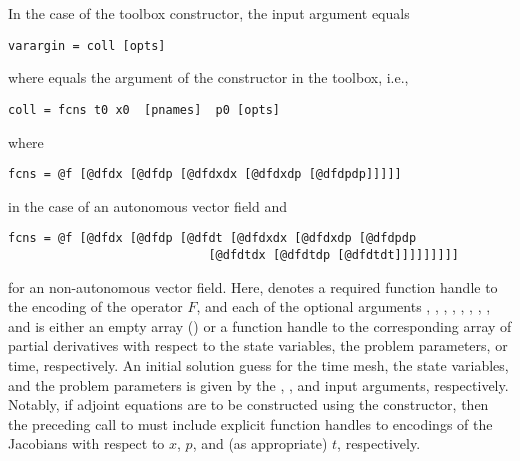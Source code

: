 In the case of the  toolbox constructor, the  input argument equals
\begin{lstlisting}[language=coco-highlight]
varargin = coll [opts]
\end{lstlisting}
where  equals the  argument of the  constructor in the  toolbox, i.e.,
\begin{lstlisting}[language=coco-highlight]
coll = fcns t0 x0  [pnames]  p0 [opts]
\end{lstlisting}
where 
\begin{lstlisting}[language=coco-highlight]
fcns = @f [@dfdx [@dfdp [@dfdxdx [@dfdxdp [@dfdpdp]]]]]
\end{lstlisting}
in the case of an autonomous vector field and 
\begin{lstlisting}[language=coco-highlight]
fcns = @f [@dfdx [@dfdp [@dfdt [@dfdxdx [@dfdxdp [@dfdpdp 
                            [@dfdtdx [@dfdtdp [@dfdtdt]]]]]]]]]
\end{lstlisting}
for an non-autonomous vector field. Here,  denotes a required function handle to the encoding of the operator $F$, and each of the optional arguments , , , , , , , , and  is either an empty array (\mcode{[]}) or a function handle to the corresponding array of partial derivatives with respect to the state variables, the problem parameters, or time, respectively.  An initial solution guess for the time mesh, the state variables, and the problem parameters is given by the , , and  input arguments, respectively. Notably, if adjoint equations are to be constructed using the  constructor, then the preceding call to  must include explicit function handles to encodings of the Jacobians with respect to $x$, $p$, and (as appropriate) $t$, respectively. 

